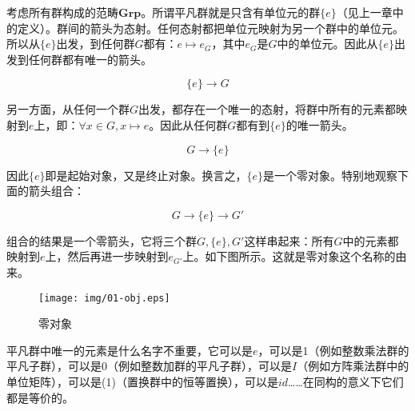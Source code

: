 \documentclass{article}
\begin{document}
\begin{example}
考虑所有群构成的范畴$\pmb{Grp}$。所谓平凡群就是只含有单位元的群$\{e\}$（见上一章中的定义）。群间的箭头为态射。任何态射都把单位元映射为另一个群中的单位元。所以从$\{e\}$出发，到任何群$G$都有：$e \mapsto e_G$，其中$e_G$是$G$中的单位元。因此从$\{e\}$出发到任何群都有唯一的箭头。

\[
\{e\} \longrightarrow G
\]

另一方面，从任何一个群$G$出发，都存在一个唯一的态射，将群中所有的元素都映射到$e$上，即：$\forall x \in G, x \mapsto e$。因此从任何群$G$都有到$\{e\}$的唯一箭头。

\[
G \longrightarrow \{e\}
\]

因此$\{e\}$即是起始对象，又是终止对象。换言之，$\{e\}$是一个零对象。特别地观察下面的箭头组合：

\[
  G \longrightarrow \{e\} \longrightarrow G'
\]

组合的结果是一个零箭头，它将三个群$G, \{e\}, G'$这样串起来：所有$G$中的元素都映射到$e$上，然后再进一步映射到$e_{G'}$上。如下图所示。这就是零对象这个名称的由来。

\begin{figure}[htbp]
 \centering
 \texttt{[image: img/01-obj.eps]}
 \caption{零对象}
 \label{fig:zero-obj}
\end{figure}

平凡群中唯一的元素是什么名字不重要，它可以是$e$，可以是1（例如整数乘法群的平凡子群），可以是0（例如整数加群的平凡子群），可以是$I$（例如方阵乘法群中的单位矩阵），可以是(1)（置换群中的恒等置换），可以是$id$……在同构的意义下它们都是等价的。
\end{example}
\end{document}
